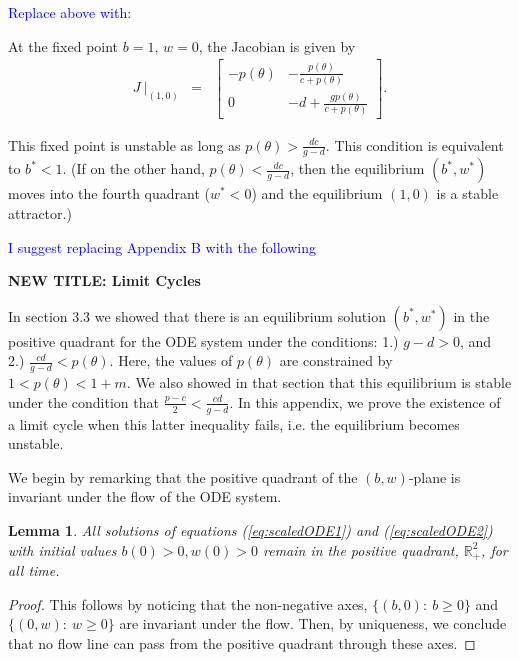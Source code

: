 \documentclass[review,authoryear]{elsarticle}
\newtheorem{lemma}[theorem]{Lemma}
\begin{document}
\textcolor{blue}{Replace above with:}

At the fixed point $b=1$, $w=0$, the Jacobian is given by 
\begin{eqnarray*}
  J~\bigg|_{(1,0)} & = & \left[
          \begin{array}{cc}
            -p(\theta) & -\frac{p(\theta)}{c+p(\theta)} \\
            0 & -d+\frac{gp(\theta)}{c+p(\theta)}
          \end{array}
          \right].
\end{eqnarray*}

This fixed point is unstable as long as $p(\theta) >\frac{dc}{g-d}$.  This condition is equivalent to $b^* < 1$.  (If on the other hand, $p(\theta) <\frac{dc}{g-d}$, then the equilibrium $(b^*,w^*)$ moves into the fourth quadrant ($w^*<0$) and the equilibrium $(1,0)$ is a stable attractor.)

\textcolor{blue}{I suggest replacing Appendix B with the following}

\textbf{NEW TITLE:  Limit Cycles}

In section 3.3 we showed that there is an equilibrium solution $(b^*,w^*)$ in the positive quadrant for the ODE system under the conditions:  1.)  $g-d>0$, and 2.) $\frac{cd}{g-d}<p(\theta)$.   Here, the values of  $p(\theta)$ are constrained by $1<p(\theta)<1+m$.   We also showed in that section that this 
equilibrium is stable under the condition that $\frac{p-c}{2} < \frac{cd}{g-d}.$   In this appendix, we prove the existence of a limit cycle when this latter inequality fails, i.e. the equilibrium becomes unstable.

We begin by remarking that the positive quadrant of the $(b,w)$-plane is invariant under the flow of the ODE system.

\begin{lemma}


All solutions of equations (\ref{eq:scaledODE1}) and
  (\ref{eq:scaledODE2}) with initial values
  $b\left( 0\right) > 0 ,w\left( 0\right) >0$ remain in the positive quadrant, $\mathbb R_+^2$, for all time.
\end{lemma}

\begin{proof}
  This follows by noticing that the non-negative axes, $\{(b,0):\  b \ge 0\}$ and $\{(0,w):\  w\ge 0\}$ are invariant under the flow.  Then, by uniqueness, we conclude that no flow line can pass from the positive quadrant through these axes.
\end{proof}
\end{document}
